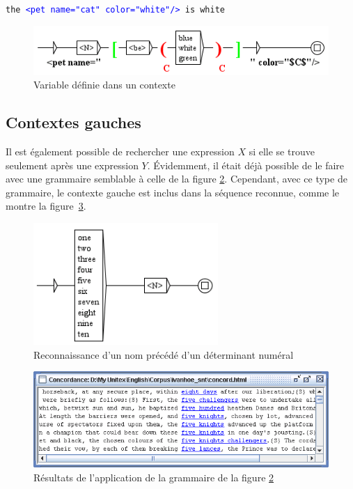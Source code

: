 \bigskip
\texttt{the \textcolor{blue}{<pet name="cat" color="white"/>} is white}

\bigskip

\begin{figure}[!h]
\begin{center}
\includegraphics[width=12.2cm]{resources/img/fig6-17.png}
\caption{Variable définie dans un contexte\label{fig-context6}}
\end{center}
\end{figure}

\subsection{Contextes gauches}
\index{\verb+$*+}
Il est également possible de rechercher une expression $X$ si elle se trouve seulement après une 
expression $Y$. Évidemment, il était déjà possible de le faire avec une grammaire semblable à celle
de la figure \ref{fig-left-context1}. Cependant, avec ce type de grammaire, le contexte gauche est
inclus dans la séquence reconnue, comme le montre la figure~\ref{fig-left-context2}.

\begin{figure}[!ht]
\begin{center}
\includegraphics[width=7cm]{resources/img/fig6-17a.png}
\caption{Reconnaissance d'un nom précédé d'un déterminant numéral\label{fig-left-context1}}
\end{center}
\end{figure}

\begin{figure}[!ht]
\begin{center}
\includegraphics[width=14cm]{resources/img/fig6-17b.png}
\caption{Résultats de l'application de la grammaire de la figure
\ref{fig-left-context1}\label{fig-left-context2}}
\end{center}
\end{figure}

